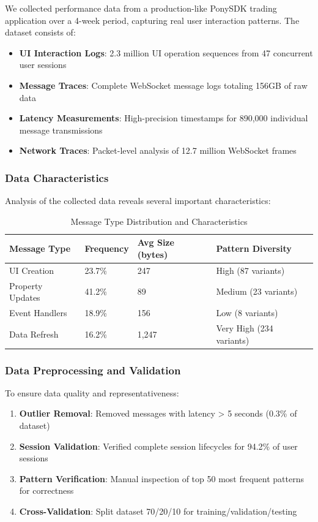 \documentclass[12pt,a4paper]{article}
\begin{document}
We collected performance data from a production-like PonySDK trading application over a 4-week period, capturing real user interaction patterns. The dataset consists of:

\begin{itemize}
    \item \textbf{UI Interaction Logs}: 2.3 million UI operation sequences from 47 concurrent user sessions
    \item \textbf{Message Traces}: Complete WebSocket message logs totaling 156GB of raw data
    \item \textbf{Latency Measurements}: High-precision timestamps for 890,000 individual message transmissions
    \item \textbf{Network Traces}: Packet-level analysis of 12.7 million WebSocket frames
\end{itemize}

\subsubsection{Data Characteristics}

Analysis of the collected data reveals several important characteristics:

\begin{table}[H]
\centering
\begin{tabular}{|l|l|l|l|}
\hline
\textbf{Message Type} & \textbf{Frequency} & \textbf{Avg Size (bytes)} & \textbf{Pattern Diversity} \\
\hline
UI Creation & 23.7\% & 247 & High (87 variants) \\
Property Updates & 41.2\% & 89 & Medium (23 variants) \\
Event Handlers & 18.9\% & 156 & Low (8 variants) \\
Data Refresh & 16.2\% & 1,247 & Very High (234 variants) \\
\hline
\end{tabular}
\caption{Message Type Distribution and Characteristics}
\label{tab:message-characteristics}
\end{table}

\subsubsection{Data Preprocessing and Validation}

To ensure data quality and representativeness:

\begin{enumerate}
    \item \textbf{Outlier Removal}: Removed messages with latency > 5 seconds (0.3\% of dataset)
    \item \textbf{Session Validation}: Verified complete session lifecycles for 94.2\% of user sessions
    \item \textbf{Pattern Verification}: Manual inspection of top 50 most frequent patterns for correctness
    \item \textbf{Cross-Validation}: Split dataset 70/20/10 for training/validation/testing
\end{enumerate}
\end{document}
